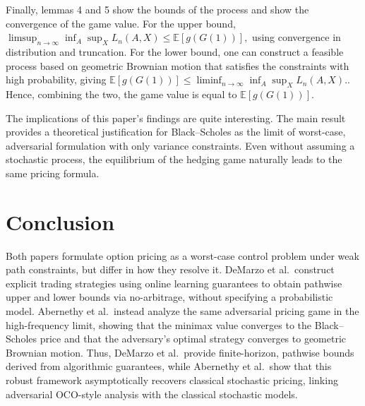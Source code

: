\documentclass[12pt]{article}
\begin{document}
Finally, lemmas 4 and 5 show the bounds of the process and show the convergence of the game value. For the upper bound,
$
\limsup_{n\to\infty} \inf_A \sup_X L_n(A,X) \le \mathbb{E}[g(G(1))],
$
using convergence in distribution and truncation. For the lower bound, one can construct a feasible process based on geometric Brownian motion that satisfies the constraints with high probability, giving
$
\mathbb{E}[g(G(1))] \le \liminf_{n\to\infty} \inf_A \sup_X L_n(A,X).
$. 
Hence, combining the two, the game value is equal to $\mathbb{E}[g(G(1))].$

The implications of this paper's findings are quite interesting. The main result provides a theoretical justification for Black–Scholes as the limit of worst-case, adversarial formulation with only variance constraints. Even without assuming a stochastic process, the equilibrium of the hedging game naturally leads to the same pricing formula.

\section*{Conclusion}
Both papers formulate option pricing as a worst-case control problem under weak path constraints, but differ in how they resolve it. DeMarzo et al.\ construct explicit trading strategies using online learning guarantees to obtain pathwise upper and lower bounds via no-arbitrage, without specifying a probabilistic model. Abernethy et al.\ instead analyze the same adversarial pricing game in the high-frequency limit, showing that the minimax value converges to the Black--Scholes price and that the adversary’s optimal strategy converges to geometric Brownian motion. Thus, DeMarzo et al.\ provide finite-horizon, pathwise bounds derived from algorithmic guarantees, while Abernethy et al.\ show that this robust framework asymptotically recovers classical stochastic pricing, linking adversarial OCO-style analysis with the classical stochastic models. 



\end{document}

